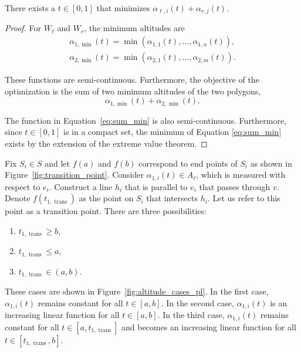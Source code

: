 \documentclass[../main.tex]{subfiles}
\begin{document}
\begin{lemma}
There exists a $t\in[0,1]$ that minimizes $\alpha_{\ell,i}(t)+\alpha_{r,j}(t)$.
\end{lemma}
\begin{proof}
For $W_{\ell}$ and $W_r$, the minimum altitudes are
\begin{equation}
\begin{aligned}
	\alpha_{1,\min}(t)=\min(\alpha_{1,1}(t),\ldots,\alpha_{1,n}(t)),\\
	\alpha_{2,\min}(t)=\min(\alpha_{2,1}(t),\ldots,\alpha_{2,m}(t)).
\end{aligned}
\end{equation}

These functions are semi-continuous. Furthermore, the objective of the optimization is the sum of two minimum altitudes of the two polygons,
\begin{equation}
\label{eq:sum_min}
	\alpha_{1,\min}(t)+\alpha_{2,\min}(t).
\end{equation}

The function in Equation~\ref{eq:sum_min} is also semi-continuous. Furthermore, since $t\in[0,1]$ is in a compact set, the minimum of Equation \ref{eq:sum_min} exists by the extension of the extreme value theorem.
\end{proof}

Fix $S_i\in S$ and let $f(a)$ and $f(b)$ correspond to end points of $S_i$ as shown in Figure~\ref{fig:transition_point}. Consider $\alpha_{1,i}(t)\in A_{\ell}$, which is measured with respect to $e_i$. Construct a line $h_{i}$ that is parallel to $e_i$ that passes through $v$. Denote $f(t_{1,\operatorname{trans}})$ as the point on $S_i$ that intersects $h_i$. Let us refer to this point as a transition point. There are three possibilities:
\begin{enumerate}
	\item $t_{1,\operatorname{trans}}\geq b$,
	\item $t_{1,\operatorname{trans}}\leq a$,
	\item $t_{1,\operatorname{trans}}\in(a,b)$.
\end{enumerate} 
These cases are shown in Figure~\ref{fig:altitude_cases_pl}. In the first case, $\alpha_{1,i}(t)$ remains constant for all $t\in[a,b]$. In the second case, $\alpha_{1,i}(t)$ is an increasing linear function for all $t\in[a,b]$. In the third case, $\alpha_{1,i}(t)$ remains constant for all $t\in[a,t_{1,\operatorname{trans}}]$ and becomes an increasing linear function for all $t\in[t_{1,\operatorname{trans}},b]$.
\end{document}
